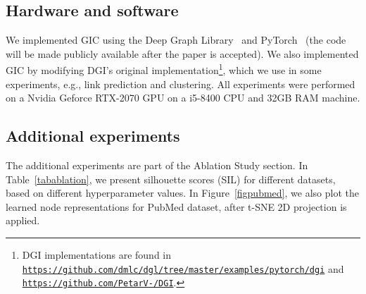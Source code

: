 \documentclass{article}
\begin{document}
\subsection{Hardware and software}

We implemented GIC using the Deep Graph Library~\cite{wang2019dgl} and PyTorch~\cite{paszke2017automatic} (the code will be made publicly available after the paper is accepted). We also implemented GIC by modifying DGI's original implementation\footnote{DGI implementations are found in \texttt{\url{https://github.com/dmlc/dgl/tree/master/examples/pytorch/dgi}} and \texttt{\url{https://github.com/PetarV-/DGI}}.}, which we use in some experiments, e.g., link prediction and clustering. All experiments were performed on a Nvidia Geforce RTX-2070 GPU on a i5-8400 CPU and 32GB RAM machine. 

\subsection{Additional experiments}

The additional experiments are part of the Ablation Study section. In Table~\ref{tabablation}, we present silhouette scores (SIL) for different datasets, based on different hyperparameter  values. In Figure~\ref{figpubmed}, we also plot the learned node representations for PubMed dataset, after t-SNE 2D projection is applied.
\end{document}
